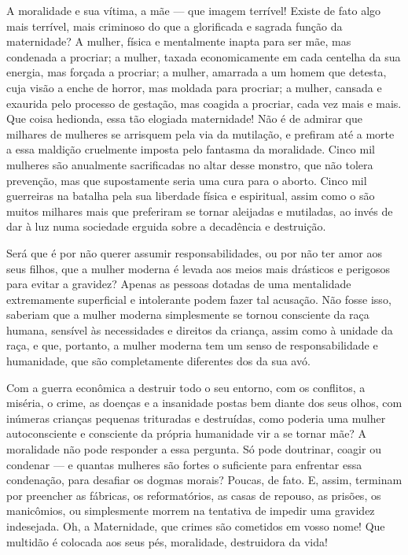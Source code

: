 A moralidade e sua vítima, a mãe --- que imagem terrível! Existe de fato
algo mais terrível, mais criminoso do que a glorificada e sagrada função
da maternidade? A mulher, física e mentalmente inapta para ser mãe, mas
condenada a procriar; a mulher, taxada economicamente em cada centelha
da sua energia, mas forçada a procriar; a mulher, amarrada a um homem
que detesta, cuja visão a enche de horror, mas moldada para procriar; a
mulher, cansada e exaurida pelo processo de gestação, mas coagida a
procriar, cada vez mais e mais. Que coisa hedionda, essa tão elogiada
maternidade! Não é de admirar que milhares de mulheres se arrisquem pela
via da mutilação, e prefiram até a morte a essa maldição cruelmente
imposta pelo fantasma da moralidade. Cinco mil mulheres são anualmente
sacrificadas no altar desse monstro, que não tolera prevenção, mas que
supostamente seria uma cura para o aborto. Cinco mil guerreiras na
batalha pela sua liberdade física e espiritual, assim como o são muitos
milhares mais que preferiram se tornar aleijadas e mutiladas, ao invés
de dar à luz numa sociedade erguida sobre a decadência e destruição.

Será que é por não querer assumir responsabilidades, ou por não ter amor
aos seus filhos, que a mulher moderna é levada aos meios mais drásticos
e perigosos para evitar a gravidez? Apenas as pessoas dotadas de uma
mentalidade extremamente superficial e intolerante podem fazer tal
acusação. Não fosse isso, saberiam que a mulher moderna
simplesmente se tornou consciente da raça humana, sensível às
necessidades e direitos da criança, assim como à unidade da raça, e que,
portanto, a mulher moderna tem um senso de responsabilidade e
humanidade, que são completamente diferentes dos da sua avó.

Com a guerra econômica a destruir todo o seu entorno, com os conflitos,\label{entorno}
a miséria, o crime, as doenças e a insanidade postas bem diante dos seus
olhos, com inúmeras crianças pequenas trituradas e destruídas, como
poderia uma mulher autoconsciente e consciente da própria humanidade vir
a se tornar mãe? A moralidade não pode responder a essa pergunta. Só
pode doutrinar, coagir ou condenar --- e quantas mulheres são fortes o
suficiente para enfrentar essa condenação, para desafiar os dogmas
morais? Poucas, de fato. E, assim, terminam por preencher as fábricas,
os reformatórios, as casas de repouso, as prisões, os manicômios, ou
simplesmente morrem na tentativa de impedir uma gravidez indesejada. Oh,
a Maternidade, que crimes são cometidos em vosso nome! Que multidão é
colocada aos seus pés, moralidade, destruidora da vida!

